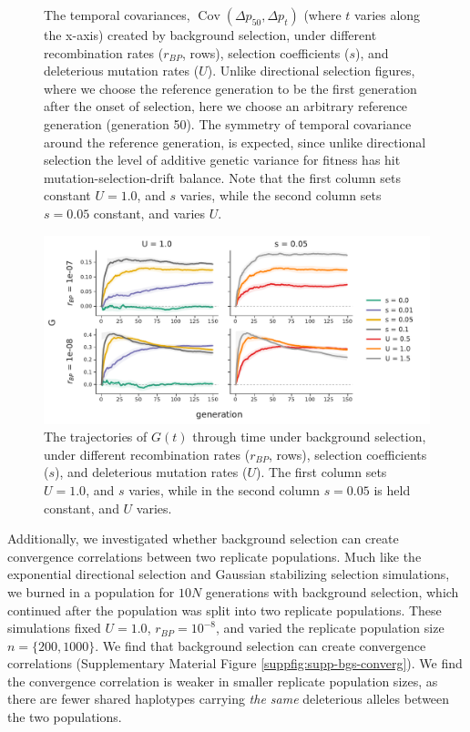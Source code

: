 \documentclass[11pt]{article}
\newcommand{\gc}[1]{{\it \color{red} #1 } }
\DeclareMathOperator{\cov}{Cov}
\begin{document}
{\begin{figure}[!ht]
  \caption{The temporal covariances, $\cov(\Delta p_{50}, \Delta p_t)$ (where
    $t$ varies along the x-axis) created by background selection, under
    different recombination rates ($r_{BP}$, rows), selection coefficients
    ($s$), and deleterious mutation rates ($U$). Unlike directional selection
    figures, where we choose the reference generation to be the first
    generation after the onset of selection, here we choose an arbitrary
    reference generation (generation 50). The symmetry of temporal covariance
    around the reference generation, is expected, since unlike directional
    selection the level of additive genetic variance for fitness has hit
    mutation-selection-drift balance. Note that the first column sets constant
  $U = 1.0$, and $s$ varies, while the second column sets $s=0.05$ constant,
and varies $U$.}

  \label{suppfig:supp-bgs-covs}
\end{figure}



\begin{figure}[!ht]
  \centering
  \includegraphics[width=\textwidth]{figures/fig-bgs-G-without-fixations.pdf}

  \caption{The trajectories of $G(t)$ through time under background selection,
    under different recombination rates ($r_{BP}$, rows), selection
    coefficients ($s$), and deleterious mutation rates ($U$). The first column
    sets $U = 1.0$, and $s$ varies, while in the second column $s=0.05$ is held
  constant, and $U$ varies.}

  \label{suppfig:supp-bgs-g}
\end{figure}

Additionally, we investigated whether background selection can create
convergence correlations between two replicate populations. Much like the
exponential directional selection and Gaussian stabilizing selection
simulations, we burned in a population for $10N$ generations with background
selection, which continued after the population was split into two replicate
populations. These simulations fixed $U = 1.0$, $r_{BP} = 10^{-8}$, and varied
the replicate population size $n = \{200, 1000\}$. We find that background
selection can create convergence correlations (Supplementary Material Figure
\ref{suppfig:supp-bgs-converg}). We find the convergence correlation is weaker
in smaller replicate population sizes, as there are fewer shared haplotypes
carrying \gc{the same} deleterious alleles between the two populations.

}
\end{document}
